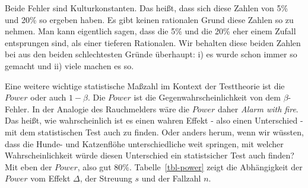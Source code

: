 \documentclass[
  letterpaper,
]{scrbook}
\begin{document}

Beide Fehler sind Kulturkonstanten. Das heißt, dass sich diese Zahlen
von 5\% und 20\% so ergeben haben. Es gibt keinen rationalen Grund diese
Zahlen so zu nehmen. Man kann eigentlich sagen, dass die 5\% und die
20\% eher einem Zufall entsprungen sind, als einer tieferen Rationalen.
Wir behalten diese beiden Zahlen bei aus den beiden schlechtesten Gründe
überhaupt: i) es wurde schon immer so gemacht und ii) viele machen es
so.

Eine weitere wichtige statistische Maßzahl im Kontext der Testtheorie
ist die \(Power\) oder auch \(1-\beta\). Die \(Power\) ist die
Gegenwahrscheinlichkeit von dem \(\beta\)-Fehler. In der Analogie des
Rauchmelders wäre die \(Power\) daher \emph{Alarm with fire}. Das heißt,
wie wahrscheinlich ist es einen wahren Effekt - also einen Unterschied -
mit dem statistischen Test auch zu finden. Oder anders herum, wenn wir
wüssten, dass die Hunde- und Katzenflöhe unterschiedliche weit springen,
mit welcher Wahrscheinlichkeit würde diesen Unterschied ein
statistsicher Test auch finden? Mit eben der \(Power\), also gut 80\%.
Tabelle~\ref{tbl-power} zeigt die Abhängigkeit der \(Power\) vom Effekt
\(\Delta\), der Streuung \(s\) und der Fallzahl \(n\).

{}
\end{document}
